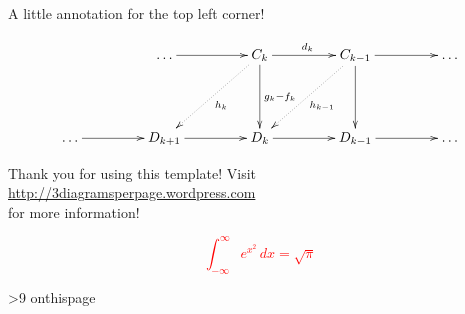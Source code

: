 \documentclass[a4paper]{article}
\newcommand{\numberofpages}{9}
\newcommand{\multistamp}[1]{%
  \loop\unless\ifnum\value{page}>#1
    \dowhatsonthispage
  \repeat}
\newcommand{\dowhatsonthispage}{%
  \null\csname onthispage\thepage\endcsname\newpage}
\newcommand{\putonpage}[2]{%
  \expandafter\def\csname onthispage#1\endcsname{#2}}
\begin{document}
\pagestyle{empty} %
\thispagestyle{empty}


\putonpage{1}{

    \vspace{0cm} \hspace{0cm}
     
    \begin{boxedminipage}[t]{10cm} 
    \scriptsize A little annotation for the top left corner! 
    \end{boxedminipage}

    \vspace{560pt} 
    \hspace{100pt}
    \begin{boxedminipage}[c]{400pt} 
    \[
    \xymatrix@+=1.55cm{
    & \hdots \ar[r] & C_k \ar[r]^{d_k} \ar[d]^{g_k - f_k} \ar@{.>}[ld]^{h_k} & C_{k-1} \ar[r] \ar[d] \ar@{.>}[ld]^{h_{k-1}} & \hdots\\ 
      \hdots \ar[r] & D_{k+1} \ar[r] & D_k \ar[r] & D_{k-1} \ar[r] & \hdots } 
    \]
    \end{boxedminipage}
}

	
\putonpage{2}{

    \vspace{15cm}
    \hspace{5cm}
    \begin{boxedminipage}{10cm}
        \begin{center}
            Thank you for using this template! Visit \\
            \href{http://3diagramsperpage.wordpress.com}{http://3diagramsperpage.wordpress.com} \\
            for more information! 
        \end{center}
    \end{boxedminipage}
}

\putonpage{3}{
    \vspace{1cm}\hspace{3cm}
    \begin{boxedminipage}{5cm}
        \begin{center}
        \textcolor{red}{\[\int_{-\infty}^{\infty} e^{x^2}\, dx = \sqrt\pi\]}
        \end{center}
    \end{boxedminipage}
}

\multistamp{\numberofpages}
\end{document}
